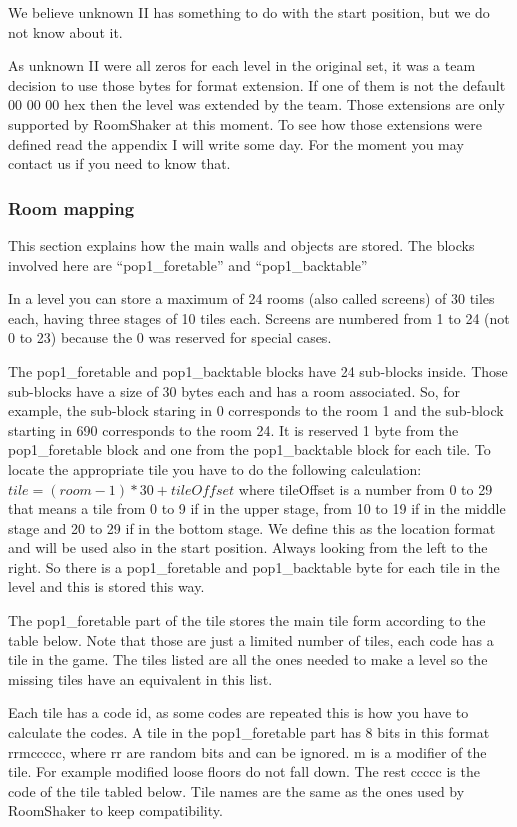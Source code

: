 \documentclass{article}
\begin{document}
 We believe unknown II has something to do with the start position, but we
 do not know about it.

 As unknown II were all zeros for each level in the original set, it was a
 team decision to use those bytes for format extension. If one of them is
 not the default 00 00 00 hex then the level was extended by the team.
 Those extensions are only supported by RoomShaker at this  moment. To see
 how those extensions were defined read the appendix I will write some day.
 For the moment you may contact us if you need to know that.

\subsubsection{Room mapping\label{room mapping}} %
 This section explains how the main walls and objects are stored. The
 blocks involved here are ``pop1\_foretable'' and ``pop1\_backtable''

 In a level you can store a maximum of 24 rooms (also called screens) of 30
 tiles each, having three stages of 10 tiles each. Screens are numbered
 from 1 to 24 (not 0 to 23) because the 0 was reserved for special cases.

 The pop1\_foretable and pop1\_backtable blocks have 24 sub-blocks inside.
 Those sub-blocks have a size of 30 bytes each and has a room associated.
 So, for example, the sub-block staring in 0 corresponds to the room 1 and
 the sub-block starting in 690 corresponds to the room 24.
 It is reserved 1 byte from the pop1\_foretable block and one from the
 pop1\_backtable block for each tile. To locate the appropriate tile you
 have to do the following calculation: $tile=(room-1)*30+tileOffset$ where
 tileOffset is a number from 0 to 29 that means a tile from 0 to 9 if in
 the upper stage, from 10 to 19 if in the middle stage and 20 to 29 if in
 the bottom stage. We define this as the location format and will be used
 also in the start position.
 Always looking from the left to the right.
 So there is a pop1\_foretable and pop1\_backtable byte for each tile in the
 level and this is stored this way.

 The pop1\_foretable part of the tile stores the main tile form according to
 the table below. Note that those are just a limited number of tiles, each
 code has a tile in the game. The tiles listed are all the ones needed to
 make a level so the missing tiles have an equivalent in this list.

 Each tile has a code id, as some codes are repeated this is how you have
 to calculate the codes. A tile in the pop1\_foretable part has 8 bits in
 this format rrmccccc, where rr are random bits and can be ignored. m is a
 modifier of the tile. For example modified loose floors do not fall down.
 The rest ccccc is the code of the tile tabled below. Tile names are the
 same as the ones used by RoomShaker to keep compatibility.
\end{document}
